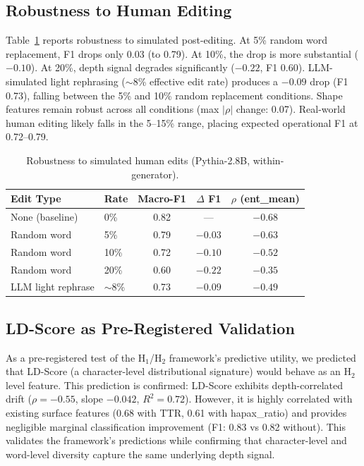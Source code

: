 \documentclass[letterpaper]{article}
\begin{document}
\subsection{Robustness to Human Editing}
\label{sec:robustness}

Table~\ref{tab:edit} reports robustness to simulated post-editing.
At 5\% random word replacement, F1 drops only 0.03 (to 0.79).
At 10\%, the drop is more substantial ($-0.10$).
At 20\%, depth signal degrades significantly ($-0.22$, F1 0.60).
LLM-simulated light rephrasing (${\sim}$8\% effective edit rate) produces a $-0.09$ drop (F1 0.73), falling between the 5\% and 10\% random replacement conditions.
Shape features remain robust across all conditions (max $|\rho|$ change: 0.07).
Real-world human editing likely falls in the 5--15\% range, placing expected operational F1 at 0.72--0.79.

\begin{table}[h]
\centering
\caption{Robustness to simulated human edits (Pythia-2.8B, within-generator).}
\label{tab:edit}
\begin{tabular}{llccc}
\toprule
Edit Type & Rate & Macro-F1 & $\Delta$ F1 & $\rho$ (ent\_mean) \\
\midrule
None (baseline) & 0\% & 0.82 & --- & $-0.68$ \\
Random word & 5\% & 0.79 & $-0.03$ & $-0.63$ \\
Random word & 10\% & 0.72 & $-0.10$ & $-0.52$ \\
Random word & 20\% & 0.60 & $-0.22$ & $-0.35$ \\
LLM light rephrase & ${\sim}$8\% & 0.73 & $-0.09$ & $-0.49$ \\
\bottomrule
\end{tabular}
\end{table}

\subsection{LD-Score as Pre-Registered Validation}
\label{sec:ldscore}

As a pre-registered test of the H$_1$/H$_2$ framework's predictive utility, we predicted that LD-Score (a character-level distributional signature) would behave as an H$_2$ level feature.
This prediction is confirmed: LD-Score exhibits depth-correlated drift ($\rho{=}-0.55$, slope $-0.042$, $R^2{=}0.72$).
However, it is highly correlated with existing surface features (0.68 with TTR, 0.61 with hapax\_ratio) and provides negligible marginal classification improvement (F1: 0.83 vs 0.82 without).
This validates the framework's predictions while confirming that character-level and word-level diversity capture the same underlying depth signal.
\end{document}
